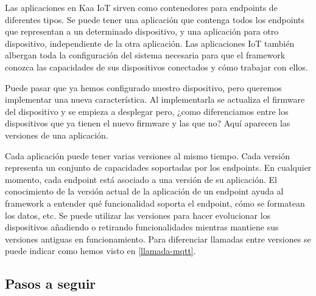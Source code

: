{Las aplicaciones en Kaa IoT sirven como contenedores para endpoints de diferentes tipos. Se puede tener una aplicación que contenga todos los endpoints que representan a un determinado dispositivo, y una aplicación para otro dispositivo, independiente de la otra aplicación. Las aplicaciones IoT también albergan toda la configuración del sistema necesaria para que el framework conozca las capacidades de sus dispositivos conectados y cómo trabajar con ellos.

Puede pasar que ya hemos configurado nuestro dispositivo, pero queremos implementar una nueva característica. Al implementarla se actualiza el firmware del dispositivo y se empieza a desplegar pero, ¿como diferenciamos entre los dispositivos que ya tienen el nuevo firmware y las que no? Aquí aparecen las versiones de una aplicación.

Cada aplicación puede tener varias versiones al mismo tiempo. Cada versión representa un conjunto de capacidades soportadas por los endpoints. En cualquier momento, cada endpoint está asociado a una versión de su aplicación. El conocimiento de la versión actual de la aplicación de un endpoint ayuda al framework a entender qué funcionalidad soporta el endpoint, cómo se formatean los datos, etc. Se puede utilizar las versiones para hacer evolucionar los dispositivos añadiendo o retirando funcionalidades mientras mantiene sus versiones antiguas en funcionamiento. Para diferenciar llamadas entre versiones se puede indicar como hemos visto en \ref{llamada-mqtt}.

\subsection{Pasos a seguir}

}

